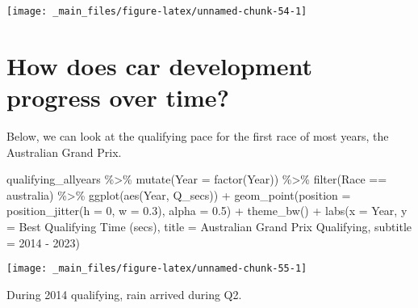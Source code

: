 \documentclass[
]{book}
\newenvironment{Shaded}{\begin{snugshade}}{\end{snugshade}}
\newcommand{\AttributeTok}[1]{\textcolor[rgb]{0.77,0.63,0.00}{#1}}
\newcommand{\DecValTok}[1]{\textcolor[rgb]{0.00,0.00,0.81}{#1}}
\newcommand{\FloatTok}[1]{\textcolor[rgb]{0.00,0.00,0.81}{#1}}
\newcommand{\FunctionTok}[1]{\textcolor[rgb]{0.00,0.00,0.00}{#1}}
\newcommand{\NormalTok}[1]{#1}
\newcommand{\SpecialCharTok}[1]{\textcolor[rgb]{0.00,0.00,0.00}{#1}}
\newcommand{\StringTok}[1]{\textcolor[rgb]{0.31,0.60,0.02}{#1}}
\begin{document}
\begin{center}\texttt{[image: \_main\_files/figure-latex/unnamed-chunk-54-1]} \end{center}

\hypertarget{how-does-car-development-progress-over-time}{%
\section{How does car development progress over time?}\label{how-does-car-development-progress-over-time}}

Below, we can look at the qualifying pace for the first race of most years, the Australian Grand Prix.

\begin{Shaded}
\begin{Highlighting}[]
\NormalTok{qualifying\_allyears }\SpecialCharTok{\%\textgreater{}\%}
  \FunctionTok{mutate}\NormalTok{(}\AttributeTok{Year =} \FunctionTok{factor}\NormalTok{(Year)) }\SpecialCharTok{\%\textgreater{}\%}
  \FunctionTok{filter}\NormalTok{(Race }\SpecialCharTok{==} \StringTok{\textquotesingle{}australia\textquotesingle{}}\NormalTok{) }\SpecialCharTok{\%\textgreater{}\%}
  \FunctionTok{ggplot}\NormalTok{(}\FunctionTok{aes}\NormalTok{(Year, Q\_secs)) }\SpecialCharTok{+}
  \FunctionTok{geom\_point}\NormalTok{(}\AttributeTok{position =} \FunctionTok{position\_jitter}\NormalTok{(}\AttributeTok{h =} \DecValTok{0}\NormalTok{, }\AttributeTok{w =} \FloatTok{0.3}\NormalTok{), }\AttributeTok{alpha =} \FloatTok{0.5}\NormalTok{) }\SpecialCharTok{+}
  \FunctionTok{theme\_bw}\NormalTok{() }\SpecialCharTok{+}
  \FunctionTok{labs}\NormalTok{(}\AttributeTok{x =} \StringTok{\textquotesingle{}Year\textquotesingle{}}\NormalTok{,}
       \AttributeTok{y =} \StringTok{\textquotesingle{}Best Qualifying Time (secs)\textquotesingle{}}\NormalTok{,}
       \AttributeTok{title =} \StringTok{\textquotesingle{}Australian Grand Prix Qualifying\textquotesingle{}}\NormalTok{,}
       \AttributeTok{subtitle =} \StringTok{\textquotesingle{}2014 {-} 2023\textquotesingle{}}\NormalTok{)}
\end{Highlighting}
\end{Shaded}

\begin{center}\texttt{[image: \_main\_files/figure-latex/unnamed-chunk-55-1]} \end{center}

During 2014 qualifying, rain arrived during Q2.
\end{document}
